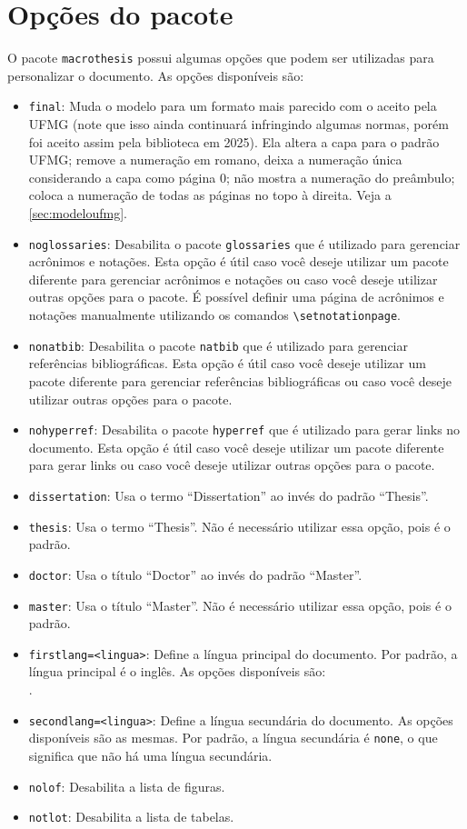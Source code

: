 \documentclass[dissertation,master,firstlang=english,secondlang=brazil]{macrothesis}
\begin{document}
\section{Opções do pacote}
O pacote \texttt{macrothesis} possui algumas opções que podem ser utilizadas para personalizar o documento. As opções disponíveis são:
\begin{itemize}
    \item \texttt{final}: Muda o modelo para um formato mais parecido com o aceito pela UFMG (note que isso ainda continuará infringindo algumas normas, porém foi aceito assim pela biblioteca em 2025). Ela altera a capa para o padrão UFMG; remove a numeração em romano, deixa a numeração única considerando a capa como página 0; não mostra a numeração do preâmbulo; coloca a numeração de todas as páginas no topo à direita. Veja a \cref{sec:modeloufmg}.
    \item \texttt{noglossaries}: Desabilita o pacote \texttt{glossaries} que é utilizado para gerenciar acrônimos e notações. Esta opção é útil caso você deseje utilizar um pacote diferente para gerenciar acrônimos e notações ou caso você deseje utilizar outras opções para o pacote. É possível definir uma página de acrônimos e notações manualmente utilizando os comandos \texttt{\textbackslash setnotationpage}.
    \item \texttt{nonatbib}: Desabilita o pacote \texttt{natbib} que é utilizado para gerenciar referências bibliográficas. Esta opção é útil caso você deseje utilizar um pacote diferente para gerenciar referências bibliográficas ou caso você deseje utilizar outras opções para o pacote.
    \item \texttt{nohyperref}: Desabilita o pacote \texttt{hyperref} que é utilizado para gerar links no documento. Esta opção é útil caso você deseje utilizar um pacote diferente para gerar links ou caso você deseje utilizar outras opções para o pacote.
    \item \texttt{dissertation}: Usa o termo ``Dissertation'' ao invés do padrão ``Thesis''.
    \item \texttt{thesis}: Usa o termo ``Thesis''. Não é necessário utilizar essa opção, pois é o padrão.
    \item \texttt{doctor}: Usa o título ``Doctor'' ao invés do padrão ``Master''.
    \item \texttt{master}: Usa o título ``Master''. Não é necessário utilizar essa opção, pois é o padrão.
    \item \texttt{firstlang=<lingua>}: Define a língua principal do documento. Por padrão, a língua principal é o inglês. As opções disponíveis são: \\\emph{\supportedlangs}. 
    \item \texttt{secondlang=<lingua>}: Define a língua secundária do documento. As opções disponíveis são as mesmas. Por padrão, a língua secundária é \texttt{none}, o que significa que não há uma língua secundária.
    \item \texttt{nolof}: Desabilita a lista de figuras.
    \item \texttt{notlot}: Desabilita a lista de tabelas.
\end{itemize}
\end{document}
